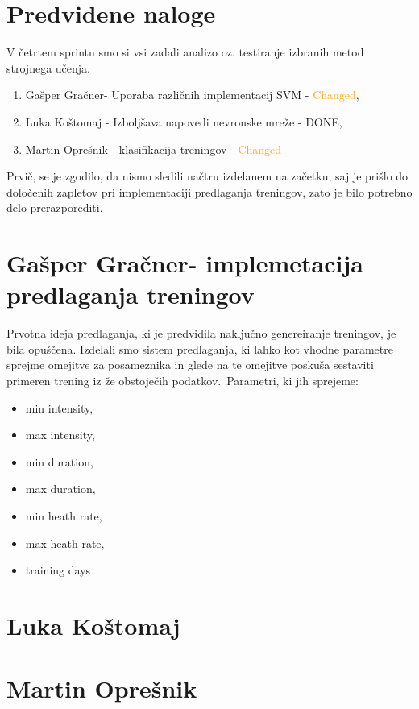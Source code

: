 \documentclass[a4paper,11pt]{article}
\begin{document}
\section{Predvidene naloge}
V četrtem sprintu smo si vsi zadali analizo oz. testiranje izbranih metod strojnega učenja.
	\begin{enumerate}
		\item{Gašper Gračner- Uporaba različnih implementacij SVM - \textcolor{Orange}{Changed}, }
		\item{Luka Koštomaj - Izboljšava napovedi nevronske mreže - \textcolor{OliveGreen}{DONE}, }
		\item{Martin Oprešnik - klasifikacija treningov - \textcolor{Orange}{Changed}}
	\end{enumerate}
Prvič, se je zgodilo, da nismo sledili načtru izdelanem na začetku, saj je prišlo do določenih zapletov pri implementaciji predlaganja treningov, zato je bilo potrebno delo prerazporediti.
	

\newpage
\section{Gašper Gračner- implemetacija predlaganja treningov}
Prvotna ideja predlaganja, ki je predvidila naključno genereiranje treningov, je bila opuščena. Izdelali smo sistem predlaganja, ki lahko kot vhodne parametre sprejme omejitve za posameznika in glede na te omejitve poskuša sestaviti primeren trening iz že obstoječih podatkov.\
Parametri, ki jih sprejeme:
\begin{itemize}
	\item{min intensity,}
	\item{max intensity,}
	\item{min duration,}
	\item{max duration,}
	\item{min heath rate,}
	\item{max heath rate,}
	\item{training days}
\end{itemize}

\section{Luka Koštomaj}



\section{Martin Oprešnik}
\end{document}
